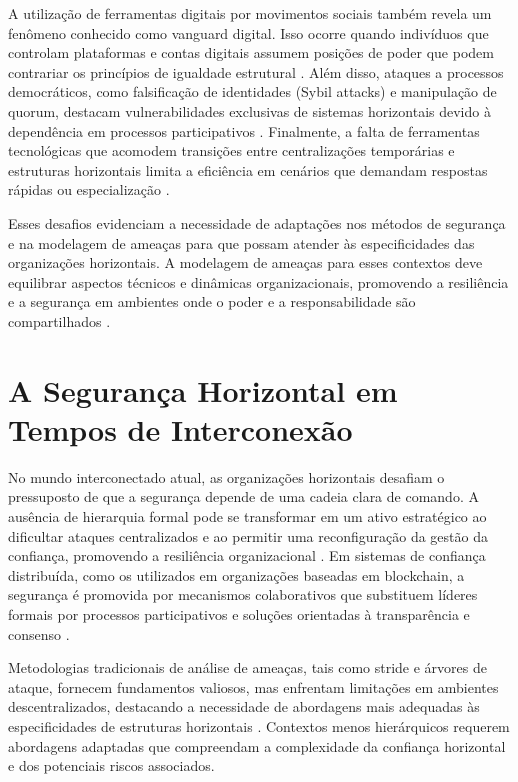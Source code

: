 A utilização de ferramentas digitais por movimentos sociais também revela um
fenômeno conhecido como vanguard digital. Isso ocorre quando indivíduos que
controlam plataformas e contas digitais assumem posições de poder que podem
contrariar os princípios de igualdade estrutural
\cite{SocialMediaTeamsAsDigitalVanguards}. Além disso, ataques a processos
democráticos, como falsificação de identidades (Sybil attacks) e manipulação de
quorum, destacam vulnerabilidades exclusivas de sistemas horizontais devido à
dependência em processos participativos \cite{MitigationSybilAttack,
TheSybilAttack}. Finalmente, a falta de ferramentas tecnológicas que acomodem
transições entre centralizações temporárias e estruturas horizontais limita a
eficiência em cenários que demandam respostas rápidas ou especialização
\cite{Colbac}.

Esses desafios evidenciam a necessidade de adaptações nos métodos de segurança e
na modelagem de ameaças para que possam atender às especificidades das
organizações horizontais. A modelagem de ameaças para esses contextos deve
equilibrar aspectos técnicos e dinâmicas organizacionais, promovendo a
resiliência e a segurança em ambientes onde o poder e a responsabilidade são
compartilhados \cite{ThreatModelingdesigningForSecurity}.

\section{A Segurança Horizontal em Tempos de Interconexão}
\label{sec:desafios_contemporaneos}

No mundo interconectado atual, as organizações horizontais desafiam o
pressuposto de que a segurança depende de uma cadeia clara de comando. A
ausência de hierarquia formal pode se transformar em um ativo estratégico
ao dificultar ataques centralizados e ao permitir uma reconfiguração da
gestão da confiança, promovendo a resiliência organizacional
\cite{EverydayRevolutions}. Em sistemas de confiança distribuída,
como os utilizados em organizações baseadas em blockchain,
a segurança é promovida por mecanismos colaborativos que
substituem líderes formais por processos participativos e soluções
orientadas à transparência e consenso \cite{Reputation-basedDAO}.

Metodologias tradicionais de análise de ameaças, tais como \gls{stride} e árvores
de ataque, fornecem fundamentos valiosos, mas enfrentam limitações em
ambientes descentralizados, destacando a necessidade de abordagens mais
adequadas às especificidades de estruturas horizontais
\cite{ThreatModellingSurvey}. Contextos menos hierárquicos requerem
abordagens adaptadas que compreendam a complexidade da confiança horizontal
e dos potenciais riscos associados.

